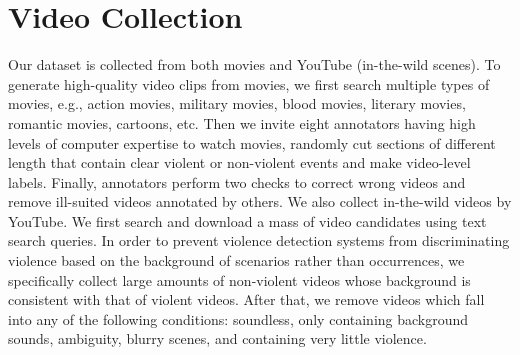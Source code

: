\documentclass[runningheads]{llncs}
\begin{document}
\maketitle




\section{Video Collection}


Our dataset is collected from both movies and YouTube (in-the-wild scenes). To generate high-quality video clips from movies, we first search multiple types of movies, e.g., action movies, military movies, blood movies, literary movies, romantic movies, cartoons, etc. Then we invite eight annotators having high levels of computer expertise to watch movies, randomly cut sections of different length that contain clear violent or non-violent events and make video-level labels. Finally, annotators perform two checks to correct wrong videos and remove ill-suited videos annotated by others. We also collect in-the-wild videos by YouTube. We first search and download a mass of video candidates using text search queries. In order to prevent violence detection systems from discriminating violence based on the background of scenarios rather than occurrences, we specifically collect large amounts of non-violent videos whose background is consistent with that of violent videos. After that, we remove videos which fall into any of the following conditions: soundless, only containing background sounds, ambiguity, blurry scenes, and containing very little violence. 
\end{document}
